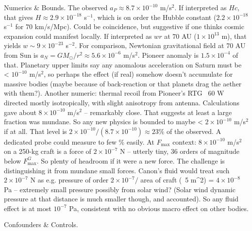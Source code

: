 \documentclass[11pt]{article}
\begin{document}
Numerics & Bounds. The observed $a_P \approx 8.7\times10^{-10}$ m/s$^2$. If interpreted as $Hc$, that gives $H \approx 2.9\times10^{-18}$ s$^{-1}$, which is on order the Hubble constant ($2.2\times10^{-18}$ s$^{-1}$ for $70$ km/s/Mpc). Could be coincidence, but suggestive if one thinks cosmic expansion could manifest locally. If interpreted as $w r$ at 70 AU ($1\times10^{13}$ m), that yields $w \sim 9\times10^{-23}$ s$^{-2}$. For comparison, Newtonian gravitational field at 70 AU from Sun is $a_N=GM_{\odot}/r^2 \approx 5.6\times10^{-6}$ m/s$^2$. Pioneer anomaly is $1.5\times10^{-4}$ of that. Planetary upper limits say any anomalous acceleration on Saturn must be < $10^{-10}$ m/s$^2$, so perhaps the effect (if real) somehow doesn’t accumulate for massive bodies (maybe because of back-reaction or that planets drag the aether with them?). Another numeric: thermal recoil from Pioneer’s RTG ~60 W directed mostly isotropically, with slight anisotropy from antenna. Calculations gave about $8\times10^{-10}$ m/s$^2$ – remarkably close. That suggests at least a large fraction was mundane. So any new physics is bounded to maybe < $2\times10^{-10}$ m/s$^2$ if at all. That level is $2\times10^{-10}/(8.7\times10^{-10}) \approx 23\%$ of the observed. A dedicated probe could measure to few \% easily. At $F_{\max}$ context: $8\times10^{-10}$ m/s$^2$ on a 250-kg craft is a force of $2\times10^{-7}$ N – utterly tiny, 36 orders of magnitude below $F_{\max}^{G}$. So plenty of headroom if it were a new force. The challenge is distinguishing it from mundane small forces. Canon’s fluid would treat such $2\times10^{-7}$ N as e.g. pressure of order $2\times10^{-7} /$ area of craft (~5 m^2) = $4\times10^{-8}$ Pa – extremely small pressure possibly from solar wind? (Solar wind dynamic pressure at that distance is much smaller though, and accounted). So any fluid effect is at most $10^{-7}$ Pa, consistent with no obvious macro effect on other bodies.


Confounders & Controls.
\end{document}
